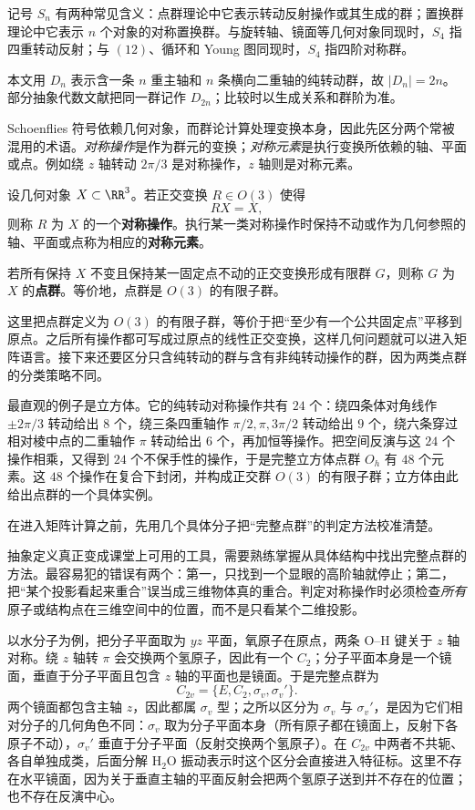 记号 $S_n$ 有两种常见含义：点群理论中它表示转动反射操作或其生成的群；置换群理论中它表示 $n$ 个对象的对称置换群。与旋转轴、镜面等几何对象同现时，$S_4$ 指四重转动反射；与 $(12)$、循环和 Young 图同现时，$S_4$ 指四阶对称群。

本文用 $D_n$ 表示含一条 $n$ 重主轴和 $n$ 条横向二重轴的纯转动群，故 $|D_n|=2n$。部分抽象代数文献把同一群记作 $D_{2n}$；比较时以生成关系和群阶为准。

Schoenflies 符号依赖几何对象，而群论计算处理变换本身，因此先区分两个常被混用的术语。\emph{对称操作}是作为群元的变换；\emph{对称元素}是执行变换所依赖的轴、平面或点。例如绕 $z$ 轴转动 $2\pi/3$ 是对称操作，$z$ 轴则是对称元素。

\begin{definition}
设几何对象 $X\subset\RR^3$。若正交变换 $R\in O(3)$ 使得
\[
R X=X,
\]
则称 $R$ 为 $X$ 的一个\textbf{对称操作}。执行某一类对称操作时保持不动或作为几何参照的轴、平面或点称为相应的\textbf{对称元素}。

若所有保持 $X$ 不变且保持某一固定点不动的正交变换形成有限群 $G$，则称 $G$ 为 $X$ 的\textbf{点群}。等价地，点群是 $O(3)$ 的有限子群。
\label{def:point-group}
\end{definition}

这里把点群定义为 $O(3)$ 的有限子群，等价于把“至少有一个公共固定点”平移到原点。之后所有操作都可写成过原点的线性正交变换，这样几何问题就可以进入矩阵语言。接下来还要区分只含纯转动的群与含有非纯转动操作的群，因为两类点群的分类策略不同。

最直观的例子是立方体。它的纯转动对称操作共有 $24$ 个：绕四条体对角线作 $\pm 2\pi/3$ 转动给出 $8$ 个，绕三条四重轴作 $\pi/2,\pi,3\pi/2$ 转动给出 $9$ 个，绕六条穿过相对棱中点的二重轴作 $\pi$ 转动给出 $6$ 个，再加恒等操作。把空间反演与这 $24$ 个操作相乘，又得到 $24$ 个不保手性的操作，于是完整立方体点群 $O_h$ 有 $48$ 个元素。这 $48$ 个操作在复合下封闭，并构成正交群 $O(3)$ 的有限子群；立方体由此给出点群的一个具体实例。

在进入矩阵计算之前，先用几个具体分子把“完整点群”的判定方法校准清楚。

抽象定义真正变成课堂上可用的工具，需要熟练掌握从具体结构中找出完整点群的方法。最容易犯的错误有两个：第一，只找到一个显眼的高阶轴就停止；第二，把“某个投影看起来重合”误当成三维物体真的重合。判定对称操作时必须检查\emph{所有}原子或结构点在三维空间中的位置，而不是只看某个二维投影。

以水分子为例，把分子平面取为 $yz$ 平面，氧原子在原点，两条 O--H 键关于 $z$ 轴对称。绕 $z$ 轴转 $\pi$ 会交换两个氢原子，因此有一个 $C_2$；分子平面本身是一个镜面，垂直于分子平面且包含 $z$ 轴的平面也是镜面。于是完整点群为
\[
C_{2v}=\{E,C_2,\sigma_v,\sigma_v'\}.
\]
两个镜面都包含主轴 $z$，因此都属 $\sigma_v$ 型；之所以区分为 $\sigma_v$ 与 $\sigma_v'$，是因为它们相对分子的几何角色不同：$\sigma_v$ 取为分子平面本身（所有原子都在镜面上，反射下各原子不动），$\sigma_v'$ 垂直于分子平面（反射交换两个氢原子）。在 $C_{2v}$ 中两者不共轭、各自单独成类，后面分解 $\mathrm{H_2O}$ 振动表示时这个区分会直接进入特征标。这里不存在水平镜面，因为关于垂直主轴的平面反射会把两个氢原子送到并不存在的位置；也不存在反演中心。

